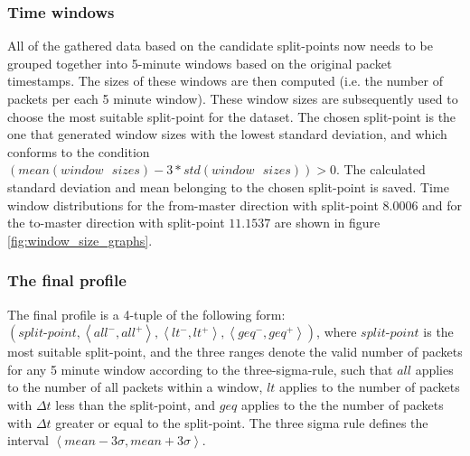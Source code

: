 \subsubsection{Time windows}
All of the gathered data based on the candidate split-points now needs to be grouped together into 5-minute windows based on the original packet
timestamps. The sizes of these windows are then computed (i.e. the number of packets per each 5 minute window). These window sizes are subsequently used to
choose the most suitable split-point for the dataset. The chosen split-point is the one that generated window sizes with the lowest standard deviation,
and which conforms to the condition $(mean(window\text{ }sizes) - 3*std(window\text{ }sizes)) > 0 $. The calculated standard deviation and mean belonging
to the chosen split-point is saved. Time window distributions for the from-master direction with split-point $8.0006$ and for the to-master direction
with split-point $11.1537$ are shown in figure \ref{fig:window_size_graphs}.

\subsubsection{The final profile}
The final profile is a 4-tuple of the following form:\\
$(split\text{-}point, \left\langle all^{-}, all^{+} \right\rangle,
\left\langle lt^{-}, lt^{+} \right\rangle, \left\langle geq^{-}, geq^{+} \right\rangle)$, where $split\text{-}point$ is the most suitable split-point,
and the three ranges denote the valid number of packets for any 5 minute window according to the three-sigma-rule, such that $all$ applies to the number of all packets
within a window, $lt$ applies to the number of packets with $\Delta t$ less than the split-point, and $geq$ applies to the the number of packets with $\Delta t$
greater or equal to the split-point. The three sigma rule defines the interval $\left\langle mean - 3\sigma , mean + 3\sigma \right\rangle$.

